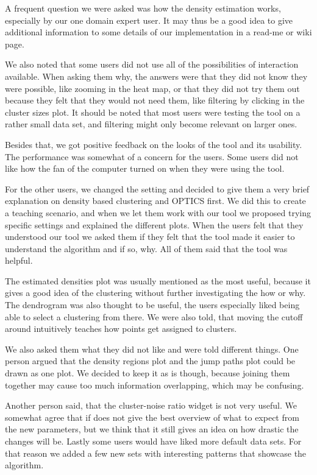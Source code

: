 \documentclass{vgtc} %
\begin{document}
A frequent question we were asked was how the density estimation works,
especially by our one domain expert user. It may thus be a good idea to give
additional information to some details of our implementation in a read-me or
wiki page.

We also noted that some users did not use all of the possibilities of
interaction available. When asking them why, the answers were that
they did not know they were possible, like zooming in the heat map, or that
they did not try them out because they felt that they would not need them, like
filtering by clicking in the cluster sizes plot. It should be noted that most users
were testing the tool on a rather small data set, and filtering might only become
relevant on larger ones.

Besides that, we got positive feedback on the looks of the tool and its usability.
The performance was somewhat of a concern for the users. Some users did not like
how the fan of the computer turned on when they were using the tool.

For the other users, we changed the setting and decided to give them a very
brief explanation on density based clustering and OPTICS first. We did this to
create a teaching scenario, and when we let them work with our tool we proposed
trying specific settings and explained the different plots. When the users felt
that they understood our tool we asked them if they felt that the tool made it
easier to understand the algorithm and if so, why. All of them said that the
tool was helpful.

The estimated densities plot was usually mentioned as the
most useful, because it gives a good idea of the clustering without further
investigating the how or why. The dendrogram was also thought to be useful, the
users especially liked being able to select a clustering from there. We were
also told, that moving the cutoff around intuitively teaches how points get
assigned to clusters.

We also asked them what they did not like and were told different things. One
person argued that the density regions plot and the jump paths plot could be
drawn as one plot. We decided to keep it as is though, because joining them
together may cause too much information overlapping, which may be confusing.

Another person said, that the cluster-noise ratio widget is not very useful. We
somewhat agree that if does not give the best overview of what to expect from
the new parameters, but we think that it still gives an idea on how drastic the
changes will be. Lastly some users would have liked more default data sets. For
that reason we added a few new sets with interesting patterns that showcase the
algorithm.
\end{document}
